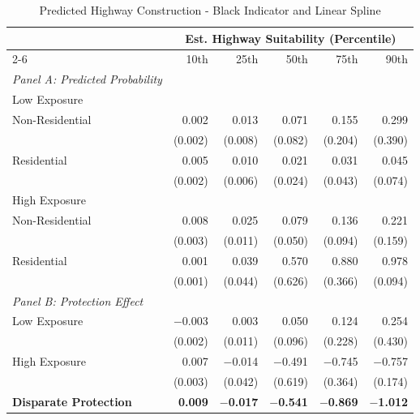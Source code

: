 \begin{table}[h]
\centering
\caption{Predicted Highway Construction - Black Indicator and Linear Spline}
\label{tab:predicted_outcomes/black_share_indicator_sweep_logitinteraction}
\begin{threeparttable}
\begin{tabular*}{1\textwidth}{@{\extracolsep{\fill}}lr@{\hspace{1.2em}}r@{\hspace{1.2em}}r@{\hspace{1.2em}}r@{\hspace{1.2em}}r@{\hspace{1.2em}}}
\toprule
 & \multicolumn{5}{c}{Est. Highway Suitability (Percentile)} \\
\cmidrule(l){2-6}
 & 10th & 25th & 50th & 75th & 90th \\
\midrule
\textit{Panel A: Predicted Probability} & & & & & \\
\addlinespace[2pt]
Low Exposure & & & & & \\
\quad Non-Residential & 0.002 & 0.013 & 0.071 & 0.155 & 0.299 \\
 & (0.002) & (0.008) & (0.082) & (0.204) & (0.390) \\[4pt]
\quad Residential & 0.005 & 0.010 & 0.021 & 0.031 & 0.045 \\
 & (0.002) & (0.006) & (0.024) & (0.043) & (0.074) \\[4pt]
High Exposure & & & & & \\
\quad Non-Residential & 0.008 & 0.025 & 0.079 & 0.136 & 0.221 \\
 & (0.003) & (0.011) & (0.050) & (0.094) & (0.159) \\[4pt]
\quad Residential & 0.001 & 0.039 & 0.570 & 0.880 & 0.978 \\
 & (0.001) & (0.044) & (0.626) & (0.366) & (0.094) \\[4pt]
\midrule
\textit{Panel B: Protection Effect} & & & & & \\
\addlinespace[2pt]
Low Exposure & $-$0.003 & 0.003 & 0.050 & 0.124 & 0.254 \\
 & (0.002) & (0.011) & (0.096) & (0.228) & (0.430) \\[4pt]
High Exposure & 0.007\rlap{$^{**}$} & $-$0.014 & $-$0.491 & $-$0.745\rlap{$^{**}$} & $-$0.757\rlap{$^{***}$} \\
 & (0.003) & (0.042) & (0.619) & (0.364) & (0.174) \\[4pt]
\addlinespace[2pt]
\textbf{Disparate Protection} & \textbf{0.009}\rlap{$^{***}$} & \textbf{$-$0.017} & \textbf{$-$0.541} & \textbf{$-$0.869}\rlap{$^{**}$} & \textbf{$-$1.012}\rlap{$^{*}$} \\

\end{tabular*}
\end{threeparttable}
\end{table}
